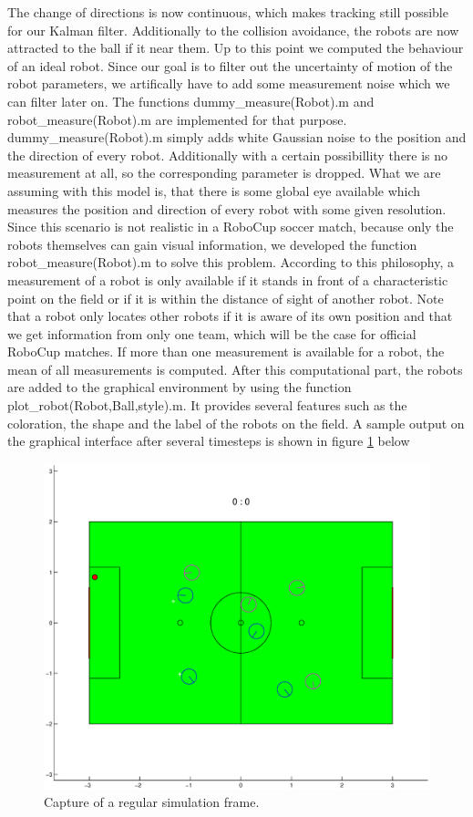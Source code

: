 The change of directions is now continuous, which makes tracking still possible for our Kalman filter. Additionally to the collision avoidance, the robots are now attracted to the ball if it near them. Up to this point we computed the behaviour of an ideal robot. Since our goal is to filter out the uncertainty of motion of the robot parameters, we artifically have to add some measurement noise which we can filter later on. The functions {\selectfont dummy\_measure(Robot).m} and {\selectfont robot\_measure(Robot).m} are implemented for that purpose. {\selectfont dummy\_measure(Robot).m} simply adds white Gaussian noise to the position and the direction of every robot. Additionally with a certain possibillity there is no measurement at all, so the corresponding parameter is dropped. What we are assuming with this model is, that there is some global eye available which measures the position and direction of every robot with some given resolution. Since this scenario is not realistic in a RoboCup soccer match, because only the robots themselves can gain visual information, we developed the function {\selectfont robot\_measure(Robot).m} to solve this problem. According to this philosophy, a measurement of a robot is only available if it stands in front of a characteristic point on the field or if it is within the distance of sight of another robot. Note that a robot only locates other robots if it is aware of its own position and that we get information from only one team, which will be the case for official RoboCup matches. If more than one measurement is available for a robot, the mean of all measurements is computed.
\parskip 10pt
After this computational part, the robots are added to the graphical environment by using the function
{\selectfont plot\_robot(Robot,Ball,style).m}. It provides several features such as the coloration, the shape and the label of the robots on the field. A sample output on the graphical interface after several timesteps is shown in figure \ref{Plot_robots} below

\begin{figure}[htbp]
	\centering
    	\includegraphics[width=12cm]{./2_Simulation/plot_robots}
  	\caption{Capture of a regular simulation frame.}
  	\label{Plot_robots}
\end{figure}

